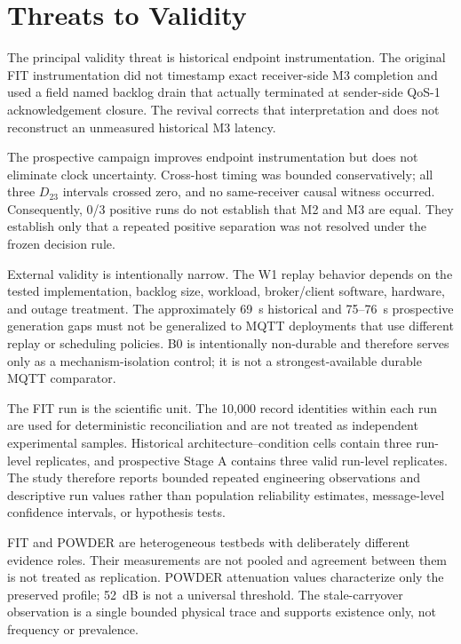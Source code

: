 \documentclass[journal]{IEEEtran}
\begin{document}
\section{Threats to Validity}
\label{sec:threats}

The principal validity threat is historical endpoint instrumentation. The original FIT instrumentation did not timestamp exact receiver-side M3 completion and used a field named backlog drain that actually terminated at sender-side QoS-1 acknowledgement closure. The revival corrects that interpretation and does not reconstruct an unmeasured historical M3 latency.

The prospective campaign improves endpoint instrumentation but does not eliminate clock uncertainty. Cross-host timing was bounded conservatively; all three $D_{23}$ intervals crossed zero, and no same-receiver causal witness occurred. Consequently, 0/3 positive runs do not establish that M2 and M3 are equal. They establish only that a repeated positive separation was not resolved under the frozen decision rule.

External validity is intentionally narrow. The W1 replay behavior depends on the tested implementation, backlog size, workload, broker/client software, hardware, and outage treatment. The approximately 69~s historical and 75--76~s prospective generation gaps must not be generalized to MQTT deployments that use different replay or scheduling policies. B0 is intentionally non-durable and therefore serves only as a mechanism-isolation control; it is not a strongest-available durable MQTT comparator.

The FIT run is the scientific unit. The 10,000 record identities within each run are used for deterministic reconciliation and are not treated as independent experimental samples. Historical architecture--condition cells contain three run-level replicates, and prospective Stage A contains three valid run-level replicates. The study therefore reports bounded repeated engineering observations and descriptive run values rather than population reliability estimates, message-level confidence intervals, or hypothesis tests.

FIT and POWDER are heterogeneous testbeds with deliberately different evidence roles. Their measurements are not pooled and agreement between them is not treated as replication. POWDER attenuation values characterize only the preserved profile; 52~dB is not a universal threshold. The stale-carryover observation is a single bounded physical trace and supports existence only, not frequency or prevalence.
\end{document}
